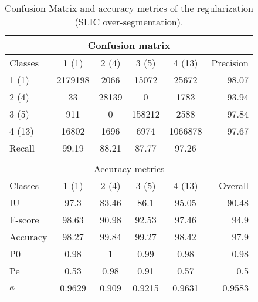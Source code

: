 \begin{table}[H]
\begin{center}
\footnotesize
\begin{tabular}{|l|c|c|c|c|r|}
\hline
\multicolumn{6}{|c|}{Confusion matrix} \\
\hline
 Classes & 1 (1) & 2 (4) & 3 (5) & 4 (13) & Precision \\
\hline
1 (1) & 2179198 & 2066 & 15072 & 25672 & 98.07 \\
\hline
2 (4) & 33 & 28139 & 0 & 1783 & 93.94 \\
\hline
3 (5) & 911 & 0 & 158212 & 2588 & 97.84 \\
\hline
4 (13) & 16802 & 1696 & 6974 & 1066878 & 97.67 \\
\hline
Recall & 99.19 & 88.21 & 87.77 & 97.26 &  \\
\hline
\multicolumn{6}{c}{ } \\
\hline
\multicolumn{6}{|c|}{Accuracy metrics} \\
\hline
 Classes & 1 (1) & 2 (4) & 3 (5) & 4 (13) & Overall \\
\hline
IU & 97.3 & 83.46 & 86.1 & 95.05 & 90.48 \\
\hline
F-score & 98.63 & 90.98 & 92.53 & 97.46 & 94.9 \\
\hline
Accuracy & 98.27 & 99.84 & 99.27 & 98.42 & 97.9 \\
\hline
P0 & 0.98 & 1 & 0.99 & 0.98 & 0.98 \\
\hline
Pe & 0.53 & 0.98 & 0.91 & 0.57 & 0.5 \\
\hline
$\kappa$ & 0.9629 & 0.909 & 0.9215 & 0.9631 & 0.9583 \\
\hline
\end{tabular}
\caption{Confusion Matrix and accuracy metrics of the regularization (SLIC over-segmentation).}
\label{table:}
\end{center}
\end{table}
